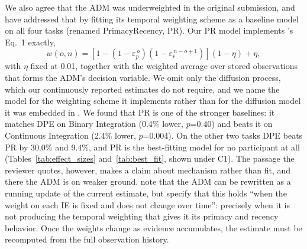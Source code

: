 We also agree that the ADM was underweighted in the original submission, and have addressed that by fitting its temporal weighting scheme as a baseline model on all four tasks (renamed PrimacyRecency, PR). Our PR model implements \citet{yoo2025people}'s Eq.~1 exactly,
\[
	w(o,n) = \left[1 - \left(1-\varepsilon_p^{\,o}\right) \left(1-\varepsilon_r^{\,n-o+1}\right)\right](1-\eta) + \eta,
\]
with $\eta$ fixed at 0.01, together with the weighted average over stored observations that forms the ADM's decision variable. We omit only the diffusion process, which our continuously reported estimates do not require, and we name the model for the weighting scheme it implements rather than for the diffusion model it was embedded in \citep{pooley2011understanding, galdo2022quest}. We found that PR is one of the stronger baselines: it matches DPE on Binary Integration (0.4\% lower, $p$=0.40) and beats it on Continuous Integration (2.4\% lower, $p$=0.004). On the other two tasks DPE beats PR by 30.0\% and 9.4\%, and PR is the best-fitting model for no participant at all (Tables~\ref{tab:effect_sizes} and~\ref{tab:best_fit}, shown under C1). The passage the reviewer quotes, however, makes a claim about mechanism rather than fit, and there the ADM is on weaker ground. \citet{yoo2025people} note that the ADM can be rewritten as a running update of the current estimate, but specify that this holds ``when the weight on each IE is fixed and does not change over time'': precisely when it is not producing the temporal weighting that gives it its primacy and recency behavior. Once the weights change as evidence accumulates, the estimate must be recomputed from the full observation history.

